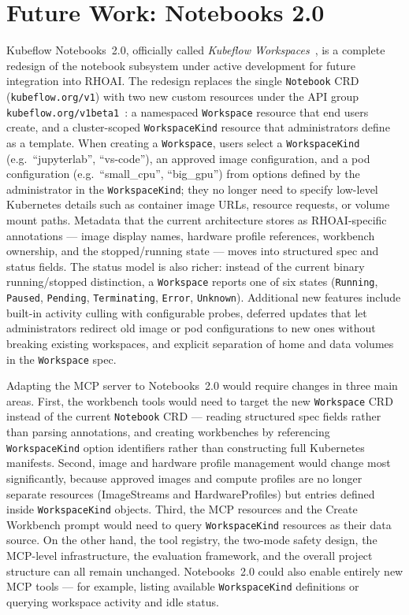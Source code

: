 \documentclass[
  digital,     %
  oneside,     %
  nosansbold,  %
  nocolorbold, %
  lof,         %
  lot,         %
]{fithesis4}
\begin{document}
\section{Future Work: Notebooks 2.0}
\label{sec:future-work}

Kubeflow Notebooks~2.0, officially called \textit{Kubeflow
Workspaces}~\parencite{notebooks-v2}, is a complete redesign of the
notebook subsystem under active development for future integration into RHOAI. The redesign replaces the single
\texttt{Notebook} CRD (\texttt{kubeflow.org/v1}) with two new custom
resources under the API group
\texttt{kubeflow.org/v1beta1}~\parencite{notebooks-v2-design}: a
namespaced \texttt{Workspace} resource that end users create, and a
cluster-scoped \texttt{WorkspaceKind} resource that administrators
define as a template. When creating a \texttt{Workspace}, users
select a \texttt{WorkspaceKind} (e.g.\ \enquote{jupyterlab},
\enquote{vs-code}), an approved image configuration, and a pod
configuration (e.g.\ \enquote{small\_cpu}, \enquote{big\_gpu}) from
options defined by the administrator in the \texttt{WorkspaceKind};
they no longer need to specify low-level Kubernetes details such as
container image URLs, resource requests, or volume mount paths.
Metadata that the current architecture stores as RHOAI-specific
annotations --- image display names, hardware profile references,
workbench ownership, and the stopped/running state --- moves into
structured spec and status fields. The status model is also richer:
instead of the current binary running/stopped distinction, a
\texttt{Workspace} reports one of six states (\texttt{Running},
\texttt{Paused}, \texttt{Pending}, \texttt{Terminating},
\texttt{Error}, \texttt{Unknown}). Additional new features include
built-in activity culling with configurable probes, deferred updates
that let administrators redirect old image or pod configurations to new
ones without breaking existing workspaces, and explicit separation of
home and data volumes in the \texttt{Workspace} spec.

Adapting the MCP server to Notebooks~2.0 would require changes in
three main areas. First, the workbench tools would need to target the
new \texttt{Workspace} CRD instead of the current \texttt{Notebook}
CRD --- reading structured spec fields rather than parsing annotations,
and creating workbenches by referencing \texttt{WorkspaceKind} option
identifiers rather than constructing full Kubernetes manifests.
Second, image and hardware profile management would change most
significantly, because approved images and compute profiles are no
longer separate resources (ImageStreams and HardwareProfiles) but
entries defined inside \texttt{WorkspaceKind} objects. Third, the MCP
resources and the Create Workbench prompt would need to query
\texttt{WorkspaceKind} resources as their data source. On the other
hand, the tool registry, the two-mode safety design, the MCP-level
infrastructure, the evaluation framework, and the overall project
structure can all remain unchanged. Notebooks~2.0 could also enable
entirely new MCP tools --- for example, listing available
\texttt{WorkspaceKind} definitions or querying workspace activity and
idle status.
\end{document}
